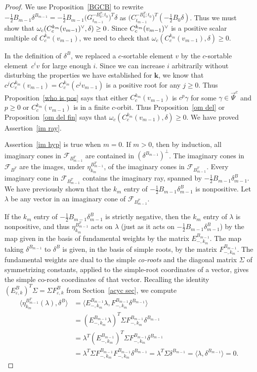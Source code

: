 \documentclass{amsart}
\theoremstyle{definition}
\theoremstyle{remark}
\numberwithin{equation}{section}
\newcommand{\ep}{\varepsilon}
\newcommand{\br}[1]{{\langle #1 \rangle}}
\newcommand{\F}{{\mathcal F}}
\newcommand{\ck}{\spcheck}
\newcommand{\0}{{\mathbf{0}}}
\newcommand{\kk}{{\boldsymbol{k}}}
\newcommand{\TravInfChar}{\Psi}
\newcommand{\TravProj}[1]{\overrightarrow{\TravInfChar}^{#1}}
\begin{document}
\begin{proof}
We use Proposition~\ref{BGCB} to rewrite $-\frac12B_{m-1}\delta^{B_{m-1}}=-\frac12B_{m-1}\bigl(G_{t_{m-1}}^{-B_0^T;t_0}\bigr)^T\delta$ as $\bigl(C_{t_{m-1}}^{-B_0^T;t_0}\bigr)^T(-\frac12B_0\delta)$.
Thus we must show that $\omega_c(C^{k_m}_c(v_{m-1})\ck,\delta)\ge0$. 
Since $C^{k_m}_c(v_{m-1})\ck$ is a positive scalar multiple of $C^{k_m}_c(v_{m-1})$, we need to check that $\omega_c(C^{k_m}_c(v_{m-1}),\delta)\ge0$. 

In the definition of $\delta^B$, we replaced a $c$-sortable element $v$ by the $c$-sortable element~$c^iv$ for large enough $i$.
Since we can increase $i$ arbitrarily without disturbing the properties we have established for $\kk$, we know that $c^jC^{k_m}_c(v_{m-1})=C^{k_m}_c(c^jv_{m-1})$ is a positive root for any $j\ge0$.
Thus Proposition~\ref{who is pos} says that either $C^{k_m}_c(v_{m-1})$ is $c^p\gamma$ for some $\gamma\in\TravProj{c}$ and $p\ge0$ or $C^{k_m}_c(v_{m-1})$ is in a finite $c$-orbit.
Thus Proposition~\ref{om del} or Proposition~\ref{om del fin} says that $\omega_c(C^{k_m}_c(v_{m-1}),\delta)\ge0$. 
We have proved Assertion~\ref{im ray}.

Assertion~\ref{im hyp} is true when $m=0$.
If $m>0$, then by induction, all imaginary cones in $\F_{B_{m-1}^T}$ are contained in $(\delta^{B_{m-1}})^\perp$.
The imaginary cones in $\F_{B^T}$ are the images, under $\eta^{B^T_{m-1}}_{k_m}$, of the imaginary cones in $\F_{B_{m-1}^T}$.
Every imaginary cone in $\F_{B_{m-1}^T}$ contains the imaginary ray, spanned by $-\frac12B_{m-1}\delta^B_{m-1}$.
We have previously shown that the $k_m$ entry of $-\frac12B_{m-1}\delta^B_{m-1}$ is nonpositive.
Let $\lambda$ be any vector in an imaginary cone of $\F_{B_{m-1}^T}$.

If the $k_m$ entry of $-\frac12B_{m-1}\delta^B_{m-1}$ is strictly negative, then the $k_m$ entry of $\lambda$ is nonpositive, and thus $\eta^{B^T_{m-1}}_{k_m}$ acts on $\lambda$ (just as it acts on $-\frac12B_{m-1}\delta^B_{m-1}$) by the map given in the basis of fundamental weights by the matrix $E_{-,k_m}^{B_{m-1}}$.
The map taking $\delta^{B_{m-1}}$ to $\delta^B$ is given, in the basis of simple roots, by the matrix $F_{-,k_m}^{B_{m-1}}$.
The fundamental weights are dual to the simple \emph{co-roots} and the diagonal matrix $\Sigma$ of symmetrizing constants, applied to the simple-root coordinates of a vector, gives the simple co-root coordinates of that vector.
Recalling the identity $(E_{\ep,k}^B)^T\Sigma=\Sigma F_{\ep,k}^B$ from Section~\ref{acyc sec}, we compute
\begin{align*}
\br{\eta^{B^T_{m-1}}_{k_m}(\lambda),\delta^B}
&=\br{E_{-,k_m}^{B_{m-1}}\lambda,F_{-,k_m}^{B_{m-1}}\delta^{B_{m-1}}}\\
&=(E_{-,k_m}^{B_{m-1}}\lambda)^T\Sigma F_{-,k_m}^{B_{m-1}}\delta^{B_{m-1}}\\
&=\lambda^T(E_{-,k_m}^{B_{m-1}})^T\Sigma F_{-,k_m}^{B_{m-1}}\delta^{B_{m-1}}\\
&=\lambda^T\Sigma F_{-,k_m}^{B_{m-1}}F_{-,k_m}^{B_{m-1}}\delta^{B_{m-1}}=\lambda^T\Sigma\delta^{B_{m-1}}=\br{\lambda,\delta^{B_{m-1}}}=0.
\end{align*}


\end{proof}
\end{document}
